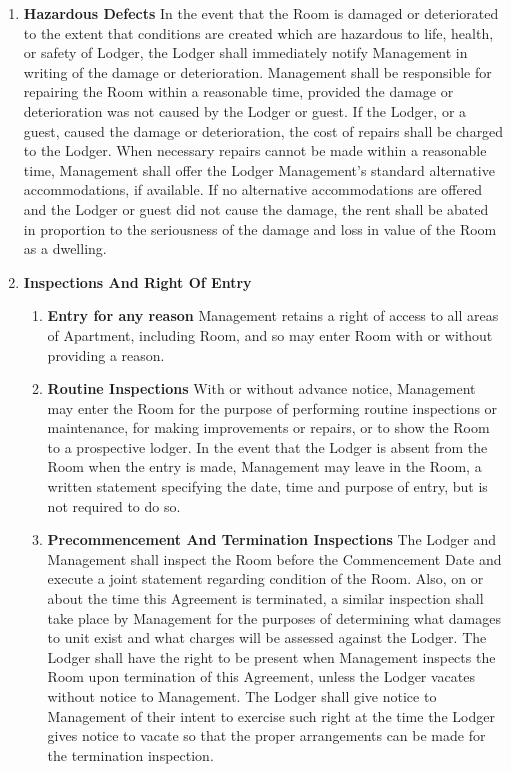 \documentclass[12pt,letterpaper]{article}
\newcommand{\management}{Management}
\newcommand{\apt}{Apartment}
\newcommand{\room}{Room}
\newcommand{\signdate}{Commencement Date}
\newcommand{\lodger}{Lodger}
\begin{document}
\begin{enumerate}
\begin{enumerate}
			\item \textbf{Trash Receptacles} \quad To provide and maintain appropriate receptacles and facilities for the deposit of garbage, rubbish and other waste, which must be removed from the \room{} by the \lodger{}. 
			\item \textbf{Heat And Water} \quad To supply running water, reasonable amounts of hot water and reasonable amounts of heat as required by seasonal weather conditions. 
		\end{enumerate}
	\item \textbf{Hazardous Defects }
		In the event that the \room{} is damaged or deteriorated to the extent that conditions are created which are hazardous to life, health, or safety of \lodger{}, the \lodger{} shall immediately notify \management{} in writing of the damage or deterioration. \management{} shall be responsible for repairing the \room{} within a reasonable time, provided the damage or deterioration was not caused by the \lodger{} or guest. If the \lodger{}, or a guest, caused the damage or deterioration, the cost of repairs shall be charged to the \lodger{}. When necessary repairs cannot be made within a reasonable time, \management{} shall offer the \lodger{} \management{}'s standard alternative accommodations, if available. If no alternative accommodations are offered and the \lodger{} or guest did not cause the damage, the rent shall be abated in proportion to the seriousness of the damage and loss in value of the \room{} as a dwelling. 
	\item \textbf{Inspections And Right Of Entry} \quad 
		\begin{enumerate}
			\item \textbf{Entry for any reason} \quad \management{} retains a right of access to all areas of \apt{}, including \room{}, and so may enter \room{} with or without providing a reason.
			\item \textbf{Routine Inspections} \quad With or without advance notice, \management{} may enter the \room{} for the purpose of performing routine inspections or maintenance, for making improvements or repairs, or to show the \room{} to a prospective lodger. In the event that the \lodger{} is absent from the \room{} when the entry is made, \management{} may leave in the \room{}, a written statement specifying the date, time and purpose of entry, but is not required to do so.
			\item \textbf{Precommencement And Termination Inspections} \quad The \lodger{} and \management{} shall inspect the \room{} before the \signdate{} and execute a joint statement regarding condition of the \room{}. Also, on or about the time this Agreement is terminated, a similar inspection shall take place by \management{} for the purposes of determining what damages to unit exist and what charges will be assessed against the \lodger{}. The \lodger{} shall have the right to be present when \management{} inspects the \room{} upon termination of this Agreement, unless the \lodger{} vacates without notice to \management{}. The \lodger{} shall give notice to \management{} of their intent to exercise such right at the time the \lodger{} gives notice to vacate so that the proper arrangements can be made for the termination inspection. 

\end{enumerate}
\end{enumerate}
\end{document}
